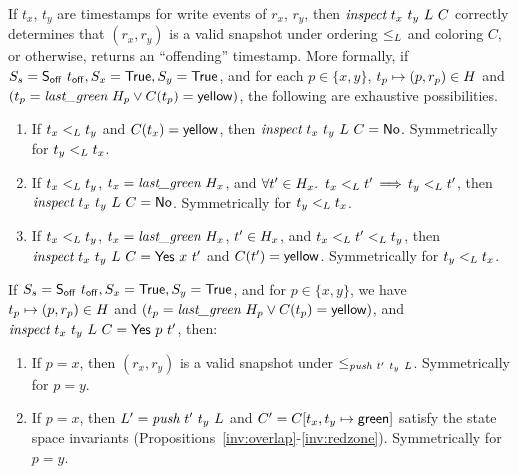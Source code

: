 \begin{lemma}\label{lem:inspect}
If $t_x$, $t_y$ are timestamps for write events of $r_x$, $r_y$, then
$\aux{inspect}\ t_x\ t_y\ \ordlist\ \C$ correctly determines that
$(r_x, r_y)$ is a valid snapshot under ordering $\mathrel{\leq_L}$ and coloring
$C$, or otherwise, returns an ``offending'' timestamp. More formally,
if $S_s = \mathsf{S_{off}}\ t_{\mathsf{off}}, S_x =\mathsf{True}, S_y =\mathsf{True}$, and for each
$p \in \{x,y\}$, $ t_p \mapsto (p, r_p) \in H$ and $(t_p
= \textit{last\_green}\ H_p \vee C(t_p) = \mathsf{yellow})$, the
following are exhaustive possibilities.
\begin{enumerate}
 \item If $t_x \mathrel{<_L} t_y$ and $ C(t_x) = {\sf yellow}$, then
      $\textit{inspect}\ t_x\ t_y\ L\ C
      = \mathsf{No}$. Symmetrically for $t_y \mathrel{<_L} t_x$.

 \item If $ t_x \mathrel{<_L} t_y $, $ t_x = \textit{last\_green}\ H_x$, and
       $\forall t' \in H_x\mathord{.}\,\ t_x \mathrel{<_L} t'\,{\implies}\,t_y \mathrel{<_L}
       t'$, then \\ $\textit{inspect}\ t_x\ t_y\ L\ C
       = \mathsf{No}$. Symmetrically for $t_y \mathrel{<_L} t_x$.

 \item If $ t_x <_{L} t_y $, $ t_x = \textit{last\_green}\ H_x
      $, $t' \in H_x$, and $t_x \mathrel{<_L} t' \mathrel{<_L} t_y$, then
      $\textit{inspect}\ t_x\ t_y\ L\ C = \mathsf{Yes}\ x\ t'$
      and $C(t') = {\sf yellow}$.  Symmetrically for $t_y \mathrel{<_L} t_x$.
\end{enumerate}
\end{lemma}

\begin{lemma}\label{lem:push}
If $S_s = \mathsf{S_{off}}\ t_{\mathsf{off}}, S_x =\mathsf{True}, S_y =\mathsf{True}$, and for $p \in \{x,y\}$,
we have $t_p \mapsto (p, r_p) \in H$ and $(t_p
= \textit{last\_green}\ H_p \vee C(t_p) = \mathsf{yellow})$, and
$\textit{inspect}\ t_x\ t_y\ L\ C = {\sf Yes}\ p\ t'$, then:
\begin{enumerate}
 \item If $p = x$, then $(r_x, r_y)$ is a valid snapshot under
 $\leq_{\aux{push}\ t'\ t_y\ \ordlist}$. Symmetrically for $p = y$.
\item If $p = x$, then $\ordlist' = \aux{push}\ t'\ t_y\ \ordlist$ and 
$C' = C[t_x, t_y \mapsto \mathsf{green}]$ satisfy the state space
 invariants
 (Propositions~\ref{inv:overlap}-\ref{inv:redzone}). Symmetrically for
 $p = y$.
\end{enumerate}
\end{lemma}


